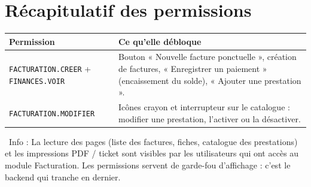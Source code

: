 \documentclass[12pt,a4paper]{article}
\newcommand{\info}[1]{\par\noindent\textcolor{lagoon}{\faInfoCircle\ Info : #1}\par}
\begin{document}
\newpage

\section{Récapitulatif des permissions}\label{sec:permissions}

\begin{center}
\begin{tabular}{p{5cm} p{9.5cm}}
\toprule
\textbf{Permission} & \textbf{Ce qu'elle débloque} \\
\midrule
\texttt{FACTURATION.CREER} + \texttt{FINANCES.VOIR} & Bouton « Nouvelle facture ponctuelle », création de factures, « Enregistrer un paiement » (encaissement du solde), « Ajouter une prestation ». \\
\midrule
\texttt{FACTURATION.MODIFIER} & Icônes crayon et interrupteur sur le catalogue : modifier une prestation, l'activer ou la désactiver. \\
\bottomrule
\end{tabular}
\end{center}

\info{La lecture des pages (liste des factures, fiches, catalogue des prestations) et les impressions PDF / ticket sont visibles par les utilisateurs qui ont accès au module Facturation. Les permissions servent de garde-fou d'affichage : c'est le backend qui tranche en dernier.}
\end{document}

